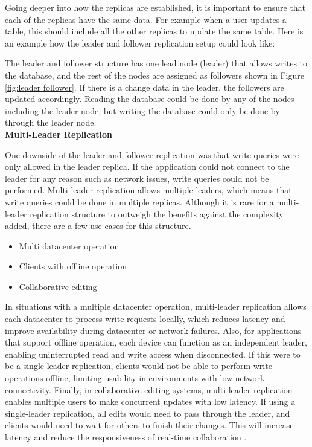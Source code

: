 Going deeper into how the replicas are established, it is important to ensure that each of the replicas have the same data.
For example when a user updates a table, this should include all the other replicas to update the same table.
Here is an example how the leader and follower replication setup could look like:

\leaderFollowerFigure

The leader and follower structure has one lead node (leader) that allows writes to the database,
and the rest of the nodes are assigned as followers shown in Figure \ref{fig:leader follower}. If there is a change data in the leader, the followers are updated accordingly.
Reading the database could be done by any of the nodes including the leader node,
but writing the database could only be done by through the leader node. \\



\noindent \textbf{Multi-Leader Replication}

One downside of the leader and follower replication was that write queries were only allowed in the leader replica.
If the application could not connect to the leader for any reason such as network issues, write queries could not be performed.
Multi-leader replication allows multiple leaders, which means that write queries could be done in multiple replicas. 
Although it is rare for a multi-leader replication structure to outweigh the benefits against the complexity added, there are a few use cases for this structure.
\begin{itemize}
    \item Multi datacenter operation
    \item Clients with offline operation
    \item Collaborative editing
\end{itemize}

In situations with a multiple datacenter operation, multi-leader replication allows each datacenter to process write requests locally,
which reduces latency and improve availability during datacenter or network failures. Also, for applications that support offline operation, 
each device can function as an independent leader, enabling uninterrupted read and write access when disconnected. If this were to be a single-leader replication, 
clients would not be able to perform write operations offline, limiting usability in environments with low network connectivity. 
Finally, in collaborative editing systems, multi-leader replication enables multiple users to make concurrent updates with low latency. 
If using a single-leader replication, all edits would need to pass through the leader, and clients would need to wait for others to finish their changes.
This will increase latency and reduce the responsiveness of real-time collaboration \cite{Kleppmann_2017}.

